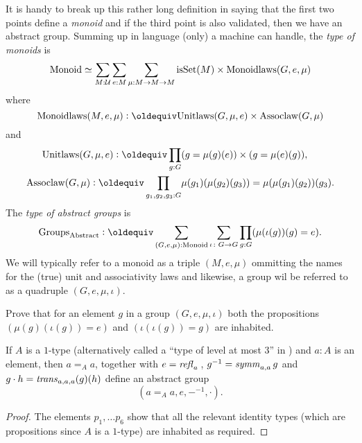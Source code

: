   \begin{remark}
    It is handy to break up this rather long definition in saying that the first two points define a {\em monoid} and if the third point is also validated, then we have an abstract group.
    Summing up in language (only) a machine can handle, the {\em type of monoids} is
$$\mathrm{Monoid}\simeq \sum_{M:\mathcal U}\sum_{e:M}\sum_{\mu{}:M\to M\to M}
\mathrm{isSet}{(M)}\times\mathrm{Monoidlaws}(G,e,\mu)
$$
where 
$$\mathrm{Monoidlaws}(M,e,\mu)\defequi\mathrm{Unitlaws}(G,\mu{},e)\times\mathrm{Assoclaw}(G,\mu{})$$and
\begin{align*}
  \mathrm{Unitlaws}(G,\mu{},e)\defequi\prod_{g:G}
&(g=\mu{}(g)(e))\times(g=\mu{}(e)(g)),\\
\mathrm{Assoclaw}(G,\mu{})\defequi\prod_{g_1,g_2,g_3:G}&\mu{}(g_1)(\mu{}(g_2)(g_3))=\mu{}(\mu{}(g_1)(g_2))(g_3).
\end{align*}
The
{\em type of abstract groups} is
$$\typeabsgp\defequi
\sum_{(G,e,\mu):\typemonoid}\sum_{\iota\colon G\to G}\prod_{g:G}(\mu{}(\iota{}(g))(g)=e).$$
We will typically refer to a monoid as a triple $(M,e,\mu)$ ommitting the names for the (true) unit and associativity laws and likewise, a group wil be referred to as a quadruple $(G,e,\mu,\iota)$.
  \end{remark}
  \begin{xca}
    Prove that for an element $g$ in a group $(G,e,\mu,\iota)$ both the propositions
$
(\mu{}(g)(\iota{}(g))=e)$ and $
(\iota{}(\iota{}(g))=g)$ are inhabited.
  \end{xca}

  \begin{lemma}\label{lem:idtypesgiveabstractgroups}
    If $A$ is a $1$-type (alternatively called a ``type of level at most $3$'' in ) and $a:A$ is an element, then $a=_Aa$, together with $e=\mathop{{\it refl}_{a}}{}$, $g^{-1}=\mathop{\mathit{symm}}_{a,a}g$ and $g\cdot h=\mathop{\mathit{trans}}_{a,a,a}(g)(h)$ define an abstract group 
$$(a=_Aa,e,{-}^{-1},\cdot).$$
  \end{lemma}
  \begin{proof}
    The elements $p_1,\dots p_6$ show that all the relevant identity types (which are propositions since $A$ is a $1$-type) are inhabited as required.
  \end{proof}





